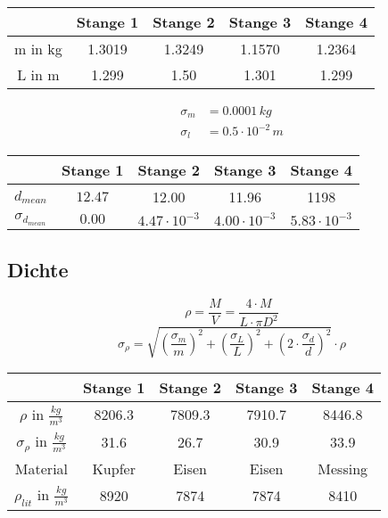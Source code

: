 \documentclass[11pt]{beamer}
\begin{document}
\begin{frame}
\begin{table}[H]\centering
\begin{tabular}{c|cccc}
& Stange 1 & Stange 2 & Stange 3 & Stange 4 \\ 
\hline
m in kg & 1.3019 & 1.3249 & 1.1570 & 1.2364 \\ 
L in m & 1.299  & 1.50 & 1.301 & 1.299 \\ 
\end{tabular} 
\end{table}
\begin{align*}
\sigma_m&=0.0001\,kg\\
\sigma_l&=0.5\cdot10^{-2}\,m
\end{align*}
\begin{table}[H]\centering
\begin{tabular}{c|cccc}
 & Stange 1 & Stange 2 & Stange 3 & Stange 4 \\ 
 \hline
$d_{mean}$ & $12.47$ & 12.00 & 11.96 & 1198 \\ 
$\sigma_{d_{mean}}$ & $0.00$ & $4.47\cdot 10^{-3}$ & $4.00\cdot 10^{-3}$ & $5.83\cdot 10^{-3}$ \\ 
\end{tabular} 
\end{table}
\end{frame}

\subsection{Dichte}
\begin{frame}
\begin{equation*}
\rho=\frac{M}{V}=\frac{4\cdot M}{L\cdot \pi D^2}
\end{equation*}
\begin{equation*}
\sigma_{\rho}=\sqrt{(\frac{\sigma_m}{m})^2+(\frac{\sigma_L}{L})^2+(2\cdot \frac{\sigma_d}{d})^2}\cdot \rho
\end{equation*}
\begin{table}[H]\centering
\begin{tabular}{c|cccc}
  & Stange 1 & Stange 2 & Stange 3 & Stange 4 \\ 
  \hline
$\rho$ in $\frac{kg}{m^3}$ & 8206.3 & 7809.3 & 7910.7 & 8446.8 \\ 
$\sigma_{\rho}$ in $\frac{kg}{m^3}$ & 31.6 & 26.7 & 30.9 & 33.9 \\ 
Material & Kupfer & Eisen & Eisen & Messing \\ 
$\rho_{lit}$ in $\frac{kg}{m^3}$ & 8920 & 7874 & 7874 & 8410 \\ 
\end{tabular} 
\end{table}
\end{frame}
\end{document}
